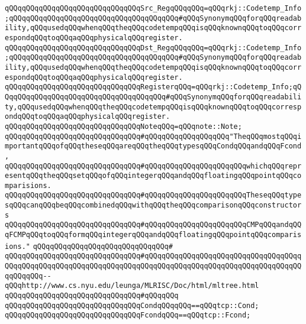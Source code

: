 \newline
\verb|qQQqqQQqqQQqqQQqqQQqqQQqqQQqqQQqSrc_RegqQQqqQQq=qQQqrkj::Codetemp_Info;qQQqqQQqqQQqqQQqqQQqqQQqqQQqqQQqqQQqqQQq#qQQqSynonymqQQqforqQQqreadability,qQQqusedqQQqwhenqQQqtheqQQqcodetempqQQqisqQQqknownqQQqtoqQQqcorrespondqQQqtoqQQqaqQQqphysicalqQQqregister.|\newline
\verb|qQQqqQQqqQQqqQQqqQQqqQQqqQQqqQQqDst_RegqQQqqQQq=qQQqrkj::Codetemp_Info;qQQqqQQqqQQqqQQqqQQqqQQqqQQqqQQqqQQqqQQq#qQQqSynonymqQQqforqQQqreadability,qQQqusedqQQqwhenqQQqtheqQQqcodetempqQQqisqQQqknownqQQqtoqQQqcorrespondqQQqtoqQQqaqQQqphysicalqQQqregister.|\newline
\verb|qQQqqQQqqQQqqQQqqQQqqQQqqQQqqQQqRegisterqQQq=qQQqrkj::Codetemp_Info;qQQqqQQqqQQqqQQqqQQqqQQqqQQqqQQqqQQqqQQq#qQQqSynonymqQQqforqQQqreadability,qQQqusedqQQqwhenqQQqtheqQQqcodetempqQQqisqQQqknownqQQqtoqQQqcorrespondqQQqtoqQQqaqQQqphysicalqQQqregister.|\newline
\newline
\verb|qQQqqQQqqQQqqQQqqQQqqQQqqQQqqQQqNoteqQQq=qQQqnote::Note;|\newline
\newline
\verb|qQQqqQQqqQQqqQQqqQQqqQQqqQQqqQQq#qQQqqQQqqQQqqQQqqQQq"TheqQQqmostqQQqimportantqQQqofqQQqtheseqQQqareqQQqtheqQQqtypesqQQqCondqQQqandqQQqFcond,|\newline
\verb|qQQqqQQqqQQqqQQqqQQqqQQqqQQqqQQq#qQQqqQQqqQQqqQQqqQQqqQQqwhichqQQqrepresentqQQqtheqQQqsetqQQqofqQQqintegerqQQqandqQQqfloatingqQQqpointqQQqcomparisions.|\newline
\verb|qQQqqQQqqQQqqQQqqQQqqQQqqQQqqQQq#qQQqqQQqqQQqqQQqqQQqqQQqTheseqQQqtypesqQQqcanqQQqbeqQQqcombinedqQQqwithqQQqtheqQQqcomparisonqQQqconstructors|\newline
\verb|qQQqqQQqqQQqqQQqqQQqqQQqqQQqqQQq#qQQqqQQqqQQqqQQqqQQqqQQqCMPqQQqandqQQqFCMPqQQqtoqQQqformqQQqintegerqQQqandqQQqfloatingqQQqpointqQQqcomparisions."|\newline
\verb|qQQqqQQqqQQqqQQqqQQqqQQqqQQqqQQq#|\newline
\verb|qQQqqQQqqQQqqQQqqQQqqQQqqQQqqQQq#qQQqqQQqqQQqqQQqqQQqqQQqqQQqqQQqqQQqqQQqqQQqqQQqqQQqqQQqqQQqqQQqqQQqqQQqqQQqqQQqqQQqqQQqqQQqqQQqqQQqqQQqqQQqqQQqqQQq--qQQqhttp://www.cs.nyu.edu/leunga/MLRISC/Doc/html/mltree.html|\newline
\verb|qQQqqQQqqQQqqQQqqQQqqQQqqQQqqQQq#qQQqqQQq|\newline
\verb|qQQqqQQqqQQqqQQqqQQqqQQqqQQqqQQqCondqQQqqQQq==qQQqtcp::Cond;|\newline
\verb|qQQqqQQqqQQqqQQqqQQqqQQqqQQqqQQqFcondqQQq==qQQqtcp::Fcond;|\newline
